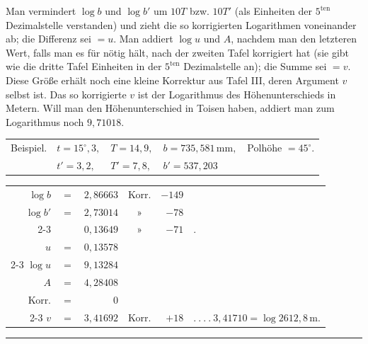 \par\noindent\hspace*{\parindent}Man vermindert $\log b$ und $\log b'$ um $10T$ bzw. $10T'$ (als Einheiten der $5^{\mathrm{ten}}$ Dezimalstelle verstanden) und zieht die so korrigierten Logarithmen voneinander ab; die Differenz sei $=u$. Man addiert $\log u$ und $A$, nachdem man den letzteren Wert, falls man es für nötig hält, nach der zweiten Tafel korrigiert hat (sie gibt wie die dritte Tafel Einheiten in der $5^{\mathrm{ten}}$ Dezimalstelle an); die Summe sei $=v$. Diese Größe erhält noch eine kleine Korrektur aus Tafel III, deren Argument $v$ selbst ist. Das so korrigierte $v$ ist der Logarithmus des Höhenunterschieds in Metern. Will man den Höhenunterschied in Toisen haben, addiert man zum Logarithmus noch $9{,}71018$.
\par\medskip
\noindent\hspace*{.5em}\begin{tabular}{l@{\quad}l@{\quad}l@{\quad}l@{\quad}l}
Beispiel.&$t=15^\circ{,}3,$&$T=14{,}9,$&$b=735{,}581\,\mathrm{mm},$&Polhöhe $=45^\circ$.\\
&$t'=3{,}2,$&$T'=7{,}8,$&$b'=537{,}203$&
\end{tabular}
\par\noindent\hspace*{1.5cm}\begingroup\setlength{\tabcolsep}{2pt}\renewcommand{\arraystretch}{1.2}
\begin{tabular}{r@{\ }c@{\ }r@{\quad}c@{\ }r@{\ }l}
$\log b$&$=$&$2{,}86663$&Korr.&$-149$&\\
$\log b'$&$=$&$2{,}73014$&»&$-78$&\\\cline{2-3}\cline{5-5}
&&$0{,}13649$&»&$-71$&\qquad .\\
$u$&$=$&$0{,}13578$&&&\\\cline{2-3}
$\log u$&$=$&$9{,}13284$&&&\\
$A$&$=$&$4{,}28408$&&&\\
Korr.&$=$&$0$&&&\\\cline{2-3}
$v$&$=$&$3{,}41692$&Korr.&$+18$&$.\ .\ .\ .\ 3{,}41710=\log2612{,}8\,\mathrm{m}.$
\end{tabular}\endgroup
\begin{center}\rule{3.5cm}{.4pt}\end{center}

